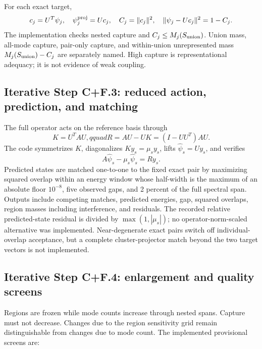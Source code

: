 \documentclass[11pt]{article}
\begin{document}
For each exact target,
\[
 c_j=U^T\psi_j,\quad \psi_j^{\rm proj}=Uc_j,\quad
 C_j=\|c_j\|^2,\quad \|\psi_j-Uc_j\|^2=1-C_j.
\]
The implementation checks nested capture and \(C_j\leq M_j(S_{\rm union})\).  Union mass, all-mode capture, pair-only capture, and within-union unrepresented mass \(M_j(S_{\rm union})-C_j\) are separately named.  High capture is representational adequacy; it is not evidence of weak coupling.

\subsection{Iterative Step C+F.3: reduced action, prediction, and matching}

The full operator acts on the reference basis through
\[
 K=U^TAU,qquad R=AU-UK=(I-UU^T)AU.
\]
The code symmetrizes \(K\), diagonalizes \(Ky_s=\mu_sy_s\), lifts
\(\widehat\psi_s=Uy_s\), and verifies
\[
 A\widehat\psi_s-\mu_s\widehat\psi_s=Ry_s.
\]
Predicted states are matched one-to-one to the fixed exact pair by maximizing squared overlap within an energy window whose half-width is the maximum of an absolute floor \(10^{-8}\), five observed gaps, and 2 percent of the full spectral span.  Outputs include competing matches, predicted energies, gap, squared overlaps, region masses including interference, and residuals.  The recorded relative predicted-state residual is divided by \(\max(1,|\mu_s|)\); no operator-norm-scaled alternative was implemented.  Near-degenerate exact pairs switch off individual-overlap acceptance, but a complete cluster-projector match beyond the two target vectors is not implemented.

\subsection{Iterative Step C+F.4: enlargement and quality screens}

Regions are frozen while mode counts increase through nested spans.  Capture must not decrease.  Changes due to the region sensitivity grid remain distinguishable from changes due to mode count.  The implemented provisional screens are:
\end{document}
